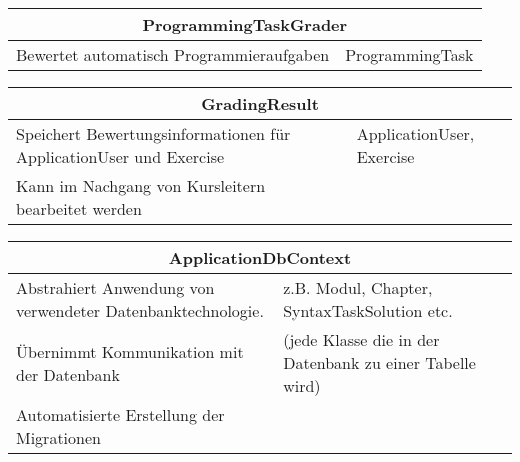 \documentclass[11pt]{article}
\begin{document}
\begin{table}[h]
\begin{tabularx}{\textwidth}{|X|X|}
\hline
\multicolumn{2}{|c|}{ProgrammingTaskGrader}\\ \hline
Bewertet automatisch Programmieraufgaben & ProgrammingTask\\  \hline
\end{tabularx}
\end{table}

\begin{table}[h]
\begin{tabularx}{\textwidth}{|X|X|}
\hline
\multicolumn{2}{|c|}{GradingResult}\\ \hline
Speichert Bewertungsinformationen für ApplicationUser und Exercise& ApplicationUser, Exercise \\  \hline
Kann im Nachgang von Kursleitern bearbeitet werden& \\ \hline
\end{tabularx}
\end{table}

\begin{table}[h]
\begin{tabularx}{\textwidth}{|X|X|}
\hline
\multicolumn{2}{|c|}{ApplicationDbContext} \\ \hline
 Abstrahiert Anwendung von verwendeter Datenbanktechnologie.&z.B. Modul, Chapter, SyntaxTaskSolution etc. \\   \hline
Übernimmt Kommunikation mit der Datenbank & (jede Klasse die in der Datenbank zu einer Tabelle wird)\\  \hline
Automatisierte Erstellung der Migrationen & \\ \hline
\end{tabularx}
\end{table}
\end{document}
